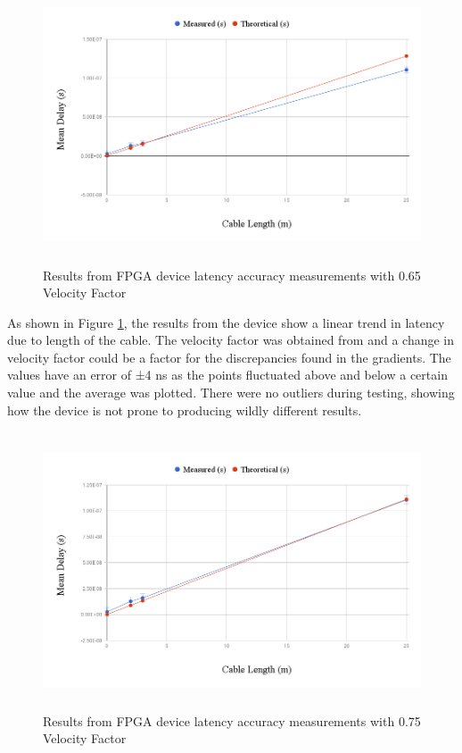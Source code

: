 \begin{figure}[H]
    \begin{center}
        \includegraphics[keepaspectratio,height=8.2cm]{Images/CableTesting}
        \caption{Results from FPGA device latency accuracy measurements with 0.65 Velocity Factor}
        \label{fig:cableTesting}
    \end{center}
\end{figure}

As shown in Figure \ref{fig:cableTesting}, the results from the device show a linear trend in latency due to length 
of the cable. The velocity factor was obtained from \cite{VelFactor} and a change in velocity factor could be a factor 
for the discrepancies found in the gradients. The values have an error of ±4 ns as the points fluctuated above and 
below a certain value and the average was plotted. There were no outliers during testing, showing how the device is 
not prone to producing wildly different results.

\begin{figure}[H]
    \begin{center}
        \includegraphics[keepaspectratio,height=8.2cm]{Images/CableTesting075}
        \caption{Results from FPGA device latency accuracy measurements with 0.75 Velocity Factor}
        \label{fig:cableTesting075}
    \end{center}
\end{figure}


